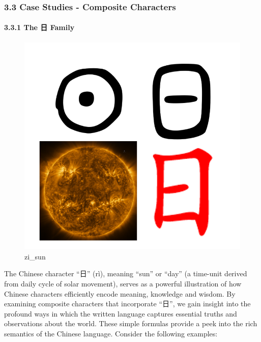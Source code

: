 \documentclass[
  11pt,
  letterpaper,
]{article}
\begin{document}
\hypertarget{case-studies---composite-characters}{%
\subsubsection{3.3 Case Studies - Composite
Characters}\label{case-studies---composite-characters}}

\hypertarget{the-ux65e5-family}{%
\paragraph{3.3.1 The 日 Family}\label{the-ux65e5-family}}

\begin{figure}
\centering
\includegraphics{./images/zi_sun.png}
\caption{zi\_sun}
\end{figure}

The Chinese character ``日'' (rì), meaning ``sun'' or ``day'' (a
time-unit derived from daily cycle of solar movement), serves as a
powerful illustration of how Chinese characters efficiently encode
meaning, knowledge and wisdom. By examining composite characters that
incorporate ``日'', we gain insight into the profound ways in which the
written language captures essential truths and observations about the
world. These simple formulas provide a peek into the rich semantics of
the Chinese language. Consider the following examples:
\end{document}
